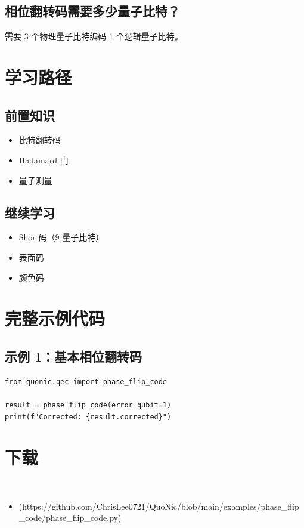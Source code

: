 \documentclass[12pt,a4paper]{article}
\begin{document}
\subsection{相位翻转码需要多少量子比特？}

需要 3 个物理量子比特编码 1 个逻辑量子比特。

\section{学习路径}

\subsection{前置知识}
\begin{itemize}
  \item 比特翻转码
  \item Hadamard 门
  \item 量子测量
\end{itemize}

\subsection{继续学习}
\begin{itemize}
  \item Shor 码（9 量子比特）
  \item 表面码
  \item 颜色码
\end{itemize}

\section{完整示例代码}

\subsection{示例 1：基本相位翻转码}

\begin{lstlisting}[style=python]
from quonic.qec import phase_flip_code

result = phase_flip_code(error_qubit=1)
print(f"Corrected: {result.corrected}")
\end{lstlisting}


\section{下载}

\begin{itemize}
  \item [phase_flip_code.py](https://github.com/ChrisLee0721/QuoNic/blob/main/examples/phase_flip_code/phase_flip_code.py)
\end{itemize}
\end{document}
